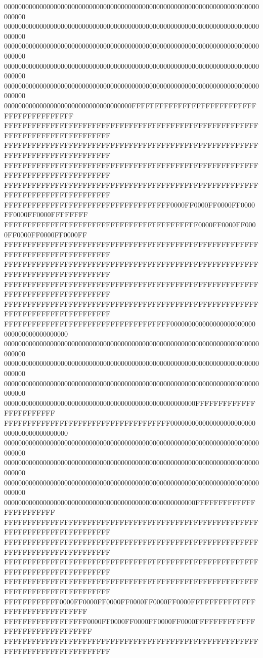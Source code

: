 000000000000000000000000000000000000000000000000000000000000000000000000000000
000000000000000000000000000000000000000000000000000000000000000000000000000000
000000000000000000000000000000000000000000000000000000000000000000000000000000
000000000000000000000000000000000000000000000000000000000000000000000000000000
000000000000000000000000000000000000000000000000000000000000000000000000000000
000000000000000000000000000000000000FFFFFFFFFFFFFFFFFFFFFFFFFFFFFFFFFFFFFFFFFF
FFFFFFFFFFFFFFFFFFFFFFFFFFFFFFFFFFFFFFFFFFFFFFFFFFFFFFFFFFFFFFFFFFFFFFFFFFFFFF
FFFFFFFFFFFFFFFFFFFFFFFFFFFFFFFFFFFFFFFFFFFFFFFFFFFFFFFFFFFFFFFFFFFFFFFFFFFFFF
FFFFFFFFFFFFFFFFFFFFFFFFFFFFFFFFFFFFFFFFFFFFFFFFFFFFFFFFFFFFFFFFFFFFFFFFFFFFFF
FFFFFFFFFFFFFFFFFFFFFFFFFFFFFFFFFFFFFFFFFFFFFFFFFFFFFFFFFFFFFFFFFFFFFFFFFFFFFF
FFFFFFFFFFFFFFFFFFFFFFFFFFFFFFFFFFFF0000FF0000FF0000FF0000FF0000FF0000FFFFFFFF
FFFFFFFFFFFFFFFFFFFFFFFFFFFFFFFFFFFFFFFFFF0000FF0000FF0000FF0000FF0000FF0000FF
FFFFFFFFFFFFFFFFFFFFFFFFFFFFFFFFFFFFFFFFFFFFFFFFFFFFFFFFFFFFFFFFFFFFFFFFFFFFFF
FFFFFFFFFFFFFFFFFFFFFFFFFFFFFFFFFFFFFFFFFFFFFFFFFFFFFFFFFFFFFFFFFFFFFFFFFFFFFF
FFFFFFFFFFFFFFFFFFFFFFFFFFFFFFFFFFFFFFFFFFFFFFFFFFFFFFFFFFFFFFFFFFFFFFFFFFFFFF
FFFFFFFFFFFFFFFFFFFFFFFFFFFFFFFFFFFFFFFFFFFFFFFFFFFFFFFFFFFFFFFFFFFFFFFFFFFFFF
FFFFFFFFFFFFFFFFFFFFFFFFFFFFFFFFFFFF000000000000000000000000000000000000000000
000000000000000000000000000000000000000000000000000000000000000000000000000000
000000000000000000000000000000000000000000000000000000000000000000000000000000
000000000000000000000000000000000000000000000000000000000000000000000000000000
000000000000000000000000000000000000000000000000000000FFFFFFFFFFFFFFFFFFFFFFFF
FFFFFFFFFFFFFFFFFFFFFFFFFFFFFFFFFFFF000000000000000000000000000000000000000000
000000000000000000000000000000000000000000000000000000000000000000000000000000
000000000000000000000000000000000000000000000000000000000000000000000000000000
000000000000000000000000000000000000000000000000000000000000000000000000000000
000000000000000000000000000000000000000000000000000000FFFFFFFFFFFFFFFFFFFFFFFF
FFFFFFFFFFFFFFFFFFFFFFFFFFFFFFFFFFFFFFFFFFFFFFFFFFFFFFFFFFFFFFFFFFFFFFFFFFFFFF
FFFFFFFFFFFFFFFFFFFFFFFFFFFFFFFFFFFFFFFFFFFFFFFFFFFFFFFFFFFFFFFFFFFFFFFFFFFFFF
FFFFFFFFFFFFFFFFFFFFFFFFFFFFFFFFFFFFFFFFFFFFFFFFFFFFFFFFFFFFFFFFFFFFFFFFFFFFFF
FFFFFFFFFFFFFFFFFFFFFFFFFFFFFFFFFFFFFFFFFFFFFFFFFFFFFFFFFFFFFFFFFFFFFFFFFFFFFF
FFFFFFFFFFFF0000FF0000FF0000FF0000FF0000FF0000FFFFFFFFFFFFFFFFFFFFFFFFFFFFFFFF
FFFFFFFFFFFFFFFFFF0000FF0000FF0000FF0000FF0000FFFFFFFFFFFFFFFFFFFFFFFFFFFFFFFF
FFFFFFFFFFFFFFFFFFFFFFFFFFFFFFFFFFFFFFFFFFFFFFFFFFFFFFFFFFFFFFFFFFFFFFFFFFFFFF
